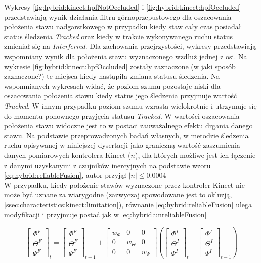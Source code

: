 Wykresy \ref{fig:hybrid:kinect:hpfNotOccluded} i \ref{fig:hybrid:kinect:hpfOccluded} przedstawiają wynik działania filtru górnoprzepustowego dla oszacowania położenia stawu nadgarstkowego w przypadku kiedy staw cały czas posiadał status śledzenia \emph{Tracked} oraz kiedy w trakcie wykonywanego ruchu status zmieniał się na \emph{Interferred}. Dla zachowania przejrzystości, wykresy przedstawiają wspomniany wynik dla położenia stawu wyznaczonego wzdłuż jednej z osi. Na wykresie \ref{fig:hybrid:kinect:hpfOccluded} zostały zaznaczone (w jaki sposób zaznaczone?) te miejsca kiedy nastąpiła zmiana statusu śledzenia. Na wspomnianych wykresach widać, że poziom szumu pozostaje niski dla oszacowania położenia stawu kiedy status jego śledzenia przyjmuje wartość \emph{Tracked}. W innym przypadku poziom szumu wzrasta wielokrotnie i utrzymuje się do momentu ponownego przyjęcia statusu  \emph{Tracked}. W wartości oszacowania położenia stawu widoczne jest to w postaci zauważalnego efektu drgania danego stawu. Na podstawie przeprowadzonych badań własnych, w metodzie śledzenia ruchu opisywanej w niniejszej dysertacji jako graniczną wartość zaszumienia danych pomiarowych kontrolera Kinect ($n$), dla których możliwe jest ich łączenie z danymi uzyskanymi z czujników inercyjnych na podstawie wzoru \eqref{eq:hybrid:reliableFusion}, autor przyjął $|n| \le 0.0004$\\

W przypadku, kiedy położenie stawów wyznaczone przez kontroler Kinect nie może być uznane za wiarygodne (zazwyczaj spowodowane jest to okluzją, \ref{ssec:characteristics:kinect:limitation}), równanie \eqref{eq:hybrid:reliableFusion} ulega modyfikacji i przyjmuje postać jak w \eqref{eq:hybrid:unreliableFusion} 

\begin{equation}
\label{eq:hybrid:unreliableFusion}
	\begin{bmatrix}  \Phi^F \\  \Theta^F \\  \Psi^F \end{bmatrix}_t = 
	\begin{bmatrix}  \Phi^F \\  \Theta^F \\  \Psi^F \end{bmatrix}_{t-1} + 
\begin{bmatrix}  w_\Phi&0&0 \\  0&w_\Theta&0 \\  0&0&w_\Psi \end{bmatrix}
	(\begin{bmatrix}  \Phi^I \\  \Theta^I \\  \Psi^I \end{bmatrix}_t -
	\begin{bmatrix}  \Phi^I \\  \Theta^I \\  \Psi^I \end{bmatrix}_{t-1})
\end{equation}


